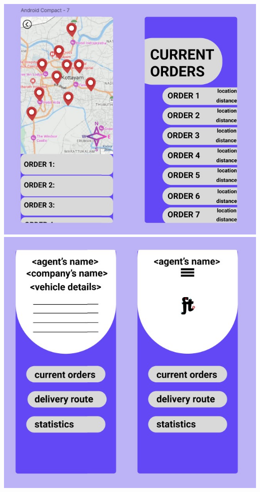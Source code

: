 \documentclass{article}
\begin{document}
\newpage
\vspace*{5cm}
\hspace*{3cm}
\includegraphics[scale=0.75]{order.jpg}
\newpage
\vspace*{5cm}
\hspace*{3cm}
\includegraphics[scale=0.75]{delivery.jpg}
\end{document}
